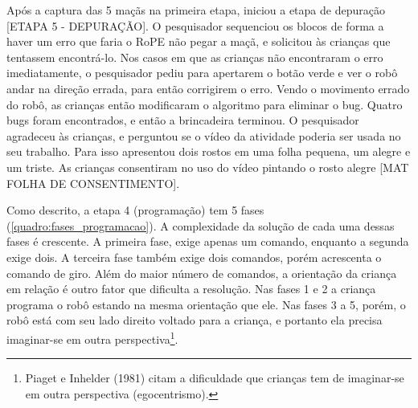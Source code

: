 {    Após a captura das 5 maçãs na primeira etapa, iniciou a etapa de depuração [ETAPA 5 - DEPURAÇÃO]. O pesquisador sequenciou os blocos de forma a haver um erro que faria o RoPE não pegar a maçã, e solicitou às crianças que tentassem encontrá-lo. Nos casos em que as crianças não encontraram o erro imediatamente, o pesquisador pediu para apertarem o botão verde e ver o robô andar na direção errada, para então corrigirem o erro. Vendo o movimento errado do robô, as crianças então modificaram o algoritmo para eliminar o bug. Quatro bugs foram encontrados, e então a brincadeira terminou. O pesquisador agradeceu às crianças, e perguntou se o vídeo da atividade poderia ser usada no seu trabalho. Para isso apresentou dois rostos em uma folha pequena, um alegre e um triste. As crianças consentiram no uso do vídeo pintando o rosto alegre [MAT FOLHA DE CONSENTIMENTO].
}

Como descrito, a etapa 4 (programação) tem 5 fases (\autoref{quadro:fases_programacao}). A complexidade da solução de cada uma dessas fases é crescente. A primeira fase, exige apenas um comando, enquanto a segunda exige dois. A terceira fase também exige dois comandos, porém acrescenta o comando de giro. Além do maior número de comandos, a orientação da criança em relação é outro fator que dificulta a resolução. Nas fases 1 e 2 a criança programa o robô estando na mesma orientação que ele. Nas fases 3 a 5, porém, o robô está com seu lado direito voltado para a criança, e portanto ela precisa imaginar-se em outra perspectiva\footnote{ Piaget e Inhelder (1981) citam a dificuldade que crianças tem de imaginar-se em outra perspectiva (egocentrismo). }.

